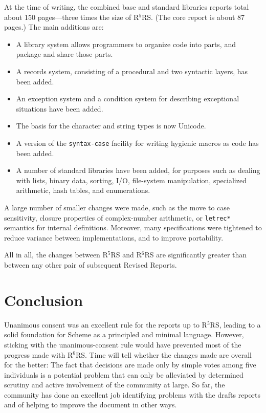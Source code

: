 \documentclass{sigplanconf}
\newcommand{\rn}[1]{R$^{#1}$RS}
\begin{document}
At the time of writing, the combined base and standard
libraries reports total about 150 pages---three times the size
of \rn{5}.  (The core report is about 87 pages.)  The main additions
are:
%
\begin{itemize}
\item A library system allows programmers to organize code into parts,
  and package and share those parts.
\item A records system, consisting of a procedural and two syntactic
  layers, has been added.
\item An exception system and a condition system for describing
  exceptional situations have been added.
\item The basis for the character and string types is now Unicode.
\item A version of the \texttt{syntax-case} facility for writing
  hygienic macros as code has been added.
\item A number of standard libraries have been added, for purposes
  such as dealing with lists, binary data, sorting, I/O, file-system
  manipulation, specialized arithmetic, hash tables, and enumerations.
\end{itemize}
%
A large number of smaller changes were made, such as the move to case
sensitivity, closure properties of complex-number arithmetic, or
\texttt{letrec*} semantics for internal definitions.  Moreover, many
specifications were tightened to reduce variance between
implementations, and to improve portability.

All in all, the changes between \rn{5} and \rn{6} are significantly
greater than between any other pair of subsequent Revised
Reports.

\section{Conclusion}
\label{sec:conclusion}

Unanimous consent was an excellent rule for the reports up to \rn{5},
leading to a solid foundation for Scheme as a principled and minimal
language.  However, sticking with the unanimous-consent rule would
have prevented most of the progress made with \rn{6}.  Time will tell
whether the changes made are overall for the better: The fact that
decisions are made only by simple votes among five individuals is a
potential problem that can only be alleviated by determined scrutiny
and active involvement of the community at large.  So far, the
community has done an excellent job identifying problems with the
drafts reports and of helping to improve the document in other ways.
\end{document}
